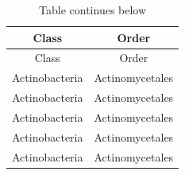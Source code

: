 \documentclass[]{article}
\begin{document}
\begin{longtable}[]{@{}cc@{}}
\caption{Table continues below}\tabularnewline
\toprule
\begin{minipage}[b]{0.38\columnwidth}\centering\strut
Class\strut
\end{minipage} & \begin{minipage}[b]{0.38\columnwidth}\centering\strut
Order\strut
\end{minipage}\tabularnewline
\midrule
\endfirsthead
\toprule
\begin{minipage}[b]{0.38\columnwidth}\centering\strut
Class\strut
\end{minipage} & \begin{minipage}[b]{0.38\columnwidth}\centering\strut
Order\strut
\end{minipage}\tabularnewline
\midrule
\endhead
\begin{minipage}[t]{0.38\columnwidth}\centering\strut
Actinobacteria\strut
\end{minipage} & \begin{minipage}[t]{0.38\columnwidth}\centering\strut
Actinomycetales\strut
\end{minipage}\tabularnewline
\begin{minipage}[t]{0.38\columnwidth}\centering\strut
Actinobacteria\strut
\end{minipage} & \begin{minipage}[t]{0.38\columnwidth}\centering\strut
Actinomycetales\strut
\end{minipage}\tabularnewline
\begin{minipage}[t]{0.38\columnwidth}\centering\strut
Actinobacteria\strut
\end{minipage} & \begin{minipage}[t]{0.38\columnwidth}\centering\strut
Actinomycetales\strut
\end{minipage}\tabularnewline
\begin{minipage}[t]{0.38\columnwidth}\centering\strut
Actinobacteria\strut
\end{minipage} & \begin{minipage}[t]{0.38\columnwidth}\centering\strut
Actinomycetales\strut
\end{minipage}\tabularnewline
\begin{minipage}[t]{0.38\columnwidth}\centering\strut
Actinobacteria\strut
\end{minipage} & \begin{minipage}[t]{0.38\columnwidth}\centering\strut
Actinomycetales\strut
\end{minipage}\tabularnewline

\end{longtable}
\end{document}
